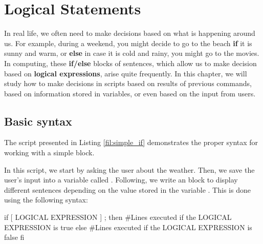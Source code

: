 \chapter{Logical Statements}\label{ch:logical_statements}

In real life, we often need to make decisions based on what is happening around us. For example, during a weekend, you might decide to go to the beach \textbf{if} it is sunny and warm, or \textbf{else} in case it is cold and rainy, you might go to the movies. In computing, these \textbf{if/else} blocks of sentences, which allow us to make decision based on \textbf{logical expressions}, arise quite frequently. In this chapter, we will study how to make decisions in  scripts based on results of previous commands, based on information stored in variables, or even based on the input from users. 

\section{Basic  syntax}

The script presented in Listing \ref{fil:simple_if} demonstrates the proper syntax for working with a simple  block.
 

In this script, we start by asking the user about the weather. Then, we save the user's input into a variable called . Following, we write an  block to display different sentences depending on the value stored in the variable . This is done using the following syntax:

\begin{command_line}[Bash]
if [ LOGICAL EXPRESSION ] ; then
    #Lines executed if the LOGICAL EXPRESSION is true
else
    #Lines executed if the LOGICAL EXPRESSION is false
fi
\end{command_line}

